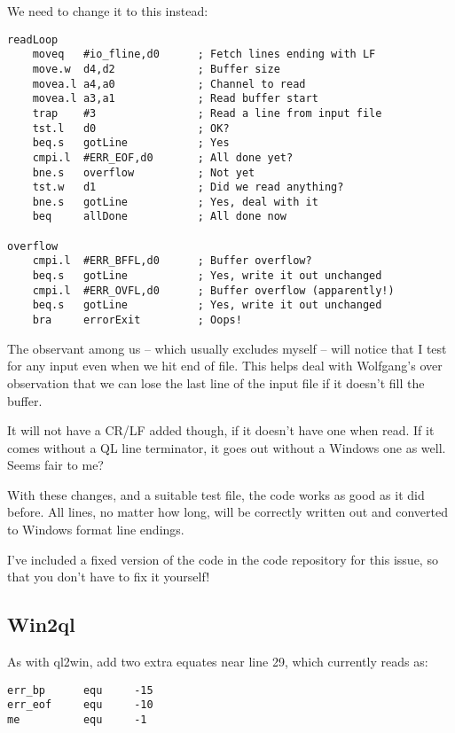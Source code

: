 We need to change it to this instead:

\begin{lstlisting}[showstringspaces=false,tabsize=4]
readLoop
    moveq   #io_fline,d0      ; Fetch lines ending with LF
    move.w  d4,d2             ; Buffer size
    movea.l a4,a0             ; Channel to read
    movea.l a3,a1             ; Read buffer start
    trap    #3                ; Read a line from input file
    tst.l   d0                ; OK?
    beq.s   gotLine           ; Yes
    cmpi.l  #ERR_EOF,d0       ; All done yet?
    bne.s   overflow          ; Not yet
    tst.w   d1                ; Did we read anything?
    bne.s   gotLine           ; Yes, deal with it
    beq     allDone           ; All done now

overflow
    cmpi.l  #ERR_BFFL,d0      ; Buffer overflow?
    beq.s   gotLine           ; Yes, write it out unchanged
    cmpi.l  #ERR_OVFL,d0      ; Buffer overflow (apparently!)
    beq.s   gotLine           ; Yes, write it out unchanged   
    bra     errorExit         ; Oops!
\end{lstlisting}

The observant among us -- which usually excludes myself -- will
notice that I test for any input even when we hit end of file. This
helps deal with Wolfgang's over observation that we can lose the last
line of the input file if it doesn't fill the buffer.

It will not have a CR/LF added though, if it doesn't have one when
read. If it comes without a QL line terminator, it goes out without
a Windows one as well. Seems fair to me?

With these changes, and a suitable test file, the code works as good
as it did before. All lines, no matter how long, will be correctly
written out and converted to Windows format line endings.

I've included a fixed version of the code in the code repository for
this issue, so that you don't have to fix it yourself!

\subsection{Win2ql}

As with ql2win, add two extra equates near line 29, which currently
reads as:

\begin{lstlisting}[showstringspaces=false,tabsize=4]
err_bp      equ     -15
err_eof     equ     -10
me          equ     -1
\end{lstlisting}

